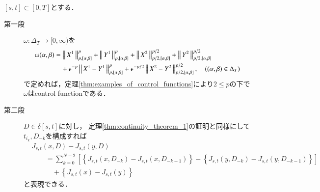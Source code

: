 	\begin{prf}
		$[s,t] \subset [0,T]$とする．
		\begin{description}
			\item[第一段]
				$\omega:\Delta_T \longrightarrow [0,\infty)$を
				\begin{align}
					\omega(\alpha,\beta) &= \left\|\, X^1\, \right\|_{p,[\alpha,\beta]}^p + \left\|\, Y^1\, \right\|_{p,[\alpha,\beta]}^p 
						+ \left\|\, X^2\, \right\|_{p/2,[\alpha,\beta]}^{p/2} + \left\|\, Y^2\, \right\|_{p/2,[\alpha,\beta]}^{p/2} \\
						&\quad + \epsilon^{-p} \left\|\, X^1 - Y^1\, \right\|_{p,[\alpha,\beta]}^p +  \epsilon^{-p/2} \left\|\, X^2 - Y^2\, \right\|_{p/2,[\alpha,\beta]}^{p/2},
					\quad ((\alpha,\beta) \in \Delta_T)
				\end{align}
				で定めれば，定理\ref{thm:examples_of_control_functions}により$2 \leq p$の下で$\omega$はcontrol functionである．
				
			\item[第二段]
				$D \in \delta[s,t]$に対し，
				定理\ref{thm:continuity_theorem_1}の証明と同様にして
				$t_{i_k},D_{-k}$を構成すれば
				\begin{align}
					&J_{s,t}(x,D) - J_{s,t}(y,D) \\
					&\qquad= \sum_{k=0}^{N-2} \left[ \left\{ J_{s,t}(x,D_{-k}) - J_{s,t}(x,D_{-k-1}) \right\} - 
						\left\{ J_{s,t}(y,D_{-k}) - J_{s,t}(y,D_{-k-1}) \right\} \right] \label{eq:continuity_theorem_2_1}\\
					&\quad\qquad + \left\{ J_{s,t}(x) - J_{s,t}(y) \right\}	\label{eq:continuity_theorem_2_2}
				\end{align}
				と表現できる．
			

\end{description}
\end{prf}
